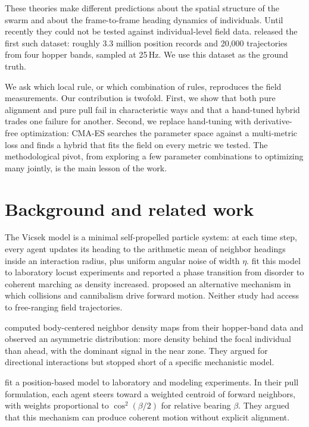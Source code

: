 \documentclass[11pt]{article}
\begin{document}
These theories make different predictions about the spatial structure of
the swarm and about the frame-to-frame heading dynamics of individuals.
Until recently they could not be tested against individual-level field
data. \citet{weinburd2024} released the first such dataset: roughly 3.3
million position records and 20{,}000 trajectories from four hopper bands,
sampled at 25\,Hz. We use this dataset as the ground truth.

We ask which local rule, or which combination of rules, reproduces the
field measurements. Our contribution is twofold. First, we show that
both pure alignment and pure pull fail in characteristic ways and that a
hand-tuned hybrid trades one failure for another. Second, we replace
hand-tuning with derivative-free optimization: CMA-ES searches the
parameter space against a multi-metric loss and finds a hybrid that fits
the field on every metric we tested. The methodological pivot, from
exploring a few parameter combinations to optimizing many jointly, is the
main lesson of the work.

\section{Background and related work}

The Vicsek model \citep{vicsek1995} is a minimal self-propelled particle
system: at each time step, every agent updates its heading to the
arithmetic mean of neighbor headings inside an interaction radius, plus
uniform angular noise of width $\eta$. \citet{buhl2006} fit this model to
laboratory locust experiments and reported a phase transition from
disorder to coherent marching as density increased. \citet{bazazi2008}
proposed an alternative mechanism in which collisions and cannibalism
drive forward motion. Neither study had access to free-ranging field
trajectories.

\citet{weinburd2024} computed body-centered neighbor density maps from
their hopper-band data and observed an asymmetric distribution: more
density behind the focal individual than ahead, with the dominant signal
in the near zone. They argued for directional interactions but stopped
short of a specific mechanistic model.

\citet{sayin2025} fit a position-based model to laboratory and modeling
experiments. In their pull formulation, each agent steers toward a
weighted centroid of forward neighbors, with weights proportional to
$\cos^2(\beta/2)$ for relative bearing $\beta$. They argued that this
mechanism can produce coherent motion without explicit alignment.
\end{document}
